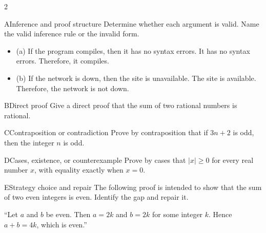 \documentclass[9pt]{extarticle}
\begin{document}
\begin{multicols}{2}
\begin{CoreProblem}{A}{Inference and proof structure}
Determine whether each argument is valid. Name the valid inference rule or the invalid form.
\begin{itemize}
  \item (a) If the program compiles, then it has no syntax errors. It has no syntax errors. Therefore, it compiles.
  \item (b) If the network is down, then the site is unavailable. The site is
        available. Therefore, the network is not down.
\end{itemize}
\end{CoreProblem}
\begin{CoreProblem}{B}{Direct proof}
Give a direct proof that the sum of two rational numbers is rational.
\end{CoreProblem}
\begin{CoreProblem}{C}{Contraposition or contradiction}
Prove by contraposition that if $3n+2$ is odd, then the integer $n$ is odd.
\end{CoreProblem}
\columnbreak
\begin{CoreProblem}{D}{Cases, existence, or counterexample}
Prove by cases that $|x|\ge 0$ for every real number $x$, with equality exactly when $x=0$.
\end{CoreProblem}
\begin{CoreProblem}{E}{Strategy choice and repair}
The following proof is intended to show that the sum of two even integers is even. Identify the gap and repair it.

``Let $a$ and $b$ be even. Then $a=2k$ and $b=2k$ for some integer $k$. Hence $a+b=4k$, which is even.''
\end{CoreProblem}
\end{multicols}
\CoreWorkArea
\FormBreak
{}
\end{document}
